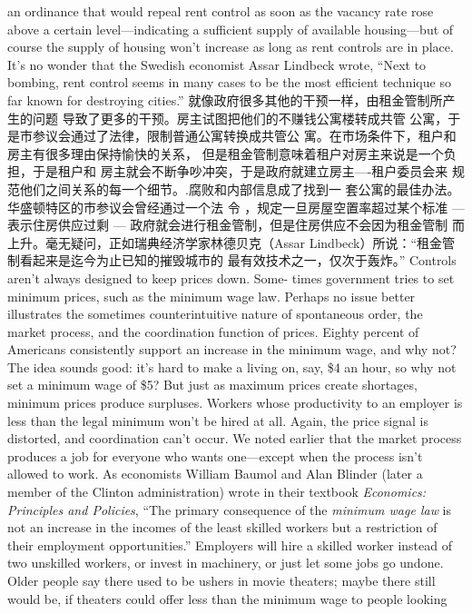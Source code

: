 \begin{paracol}{2}
an ordinance that would repeal rent control as soon as the vacancy rate rose above a certain level---indicating a sufficient
supply of available housing---but of course the supply of housing won't increase as long as rent controls are in place. It's no
wonder that the Swedish economist Assar Lindbeck wrote,
``Next to bombing, rent control seems in many cases to be the
most efficient technique so far known for destroying cities.''
\switchcolumn
就像政府很多其他的干预一样，由租金管制所产生的问题
导致了更多的干预。房主试图把他们的不赚钱公寓楼转成共管
公寓，于是市参议会通过了法律，限制普通公寓转换成共管公
寓。在市场条件下，租户和房主有很多理由保持愉快的关系，
但是租金管制意味着租户对房主来说是一个负担，于是租户和
房主就会不断争吵冲突，于是政府就建立房主----租户委员会来
规范他们之间关系的每一个细节。.腐败和内部信息成了找到一
套公寓的最佳办法。华盛顿特区的市参议会曾经通过一个法
令 ，规定一旦房屋空置率超过某个标准 --- 表示住房供应过剩
--- 政府就会进行租金管制，但是住房供应不会因为租金管制
而上升。毫无疑问，正如瑞典经济学家林德贝克（Assar Lindbeck）所说：“租金管制看起来是迄今为止已知的摧毁城市的
最有效技术之一，仅次于轰炸。”
\switchcolumn*
Controls aren't always designed to keep prices down. Some-
times government tries to set minimum prices, such as the minimum wage law. Perhaps no issue better illustrates the sometimes
counterintuitive nature of spontaneous order, the market
process, and the coordination function of prices. Eighty percent
of Americans consistently support an increase in the minimum
wage, and why not? The idea sounds good: it's hard to make a
living on, say, \$4 an hour, so why not set a minimum wage of
\$5? But just as maximum prices create shortages, minimum
prices produce surpluses. Workers whose productivity to an
employer is less than the legal minimum won't be hired at all.
Again, the price signal is distorted, and coordination can't
occur. We noted earlier that the market process produces a job
for everyone who wants one---except when the process isn't allowed to work. As economists William Baumol and Alan
Blinder (later a member of the Clinton administration) wrote in
their textbook \textit{Economics: Principles and Policies}, ``The primary
consequence of the \textit{minimum wage law} is not an increase in the
incomes of the least skilled workers but a restriction of their
employment opportunities.'' Employers will hire a skilled
worker instead of two unskilled workers, or invest in machinery,
or just let some jobs go undone. Older people say there used to
be ushers in movie theaters; maybe there still would be, if theaters could offer less than the minimum wage to people looking

\end{paracol}
